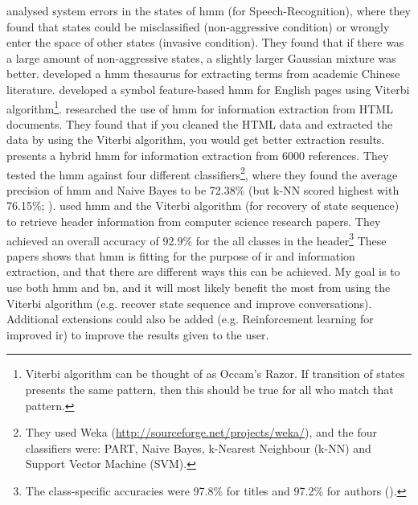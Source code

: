 \vspace{0.5em}\newline
\citet{Gao1999} analysed system errors in the states of \gls{hmm} (for Speech-Recognition), where they found that states could be misclassified (non-aggressive condition) 
or wrongly enter the space of other states (invasive condition). They found that if there was a large amount of non-aggressive states, a slightly larger Gaussian mixture was 
better. 
\vspace{0.5em}\newline
\citet{Pan2015} developed a \gls{hmm} thesaurus for extracting terms from academic Chinese literature. \citet{Yongjin2009} developed a symbol feature-based \gls{hmm} for English 
pages using Viterbi algorithm\footnote{Viterbi algorithm can be thought of as Occam's Razor. If transition of states presents the same pattern, then this should be true for all 
	who match that pattern.}. \citet{Zhou2010} researched the use of \gls{hmm} for information extraction from HTML documents. They found that if you cleaned the HTML data and 
extracted the data by using the Viterbi algorithm, you would get better extraction results.
\vspace{0.5em}\newline
\citet{Barros2008} presents a hybrid \gls{hmm} for information extraction from 6000 references. They tested the \gls{hmm} against four different 
classifiers\footnote{They used Weka (\url{http://sourceforge.net/projects/weka/}), and the four classifiers were: PART, Naive Bayes, k-Nearest Neighbour (k-NN) and Support Vector 
	Machine (SVM).}, where they found the average precision of \gls{hmm} and Naive Bayes to be 72.38\% (but k-NN scored highest with 76.15\%; \cite[p.~5]{Barros2008}).
 \citet{Seymore1999} used \gls{hmm} and the Viterbi algorithm (for recovery of state 
sequence) to retrieve header information from computer science research papers. They achieved an overall accuracy of 92.9\% for the all classes in the header\footnote{The 
	class-specific accuracies were 97.8\% for titles and 97.2\% for authors (\cite[p.~6]{Seymore1999}).} 
\newpage\noindent
These papers shows that \gls{hmm} is fitting for the purpose of \gls{ir} and information extraction, and that there are different ways this can be achieved. 
My goal is to use both \gls{hmm} and \gls{bn}, and it will most likely benefit the most from using the Viterbi algorithm (e.g. recover state sequence and improve 
conversations). Additional extensions could also be added (e.g. Reinforcement learning for improved \gls{ir}) to improve the results given to the user.

